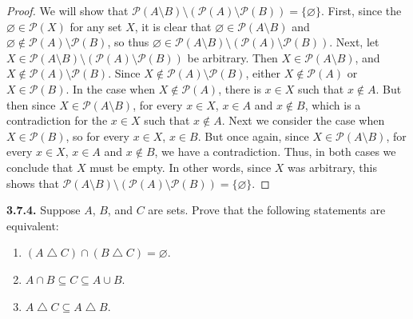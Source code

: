 \documentclass[12pt]{amsart}
\newenvironment{statement}[1]{\smallskip\noindent\color[rgb]{.6627, .3529, .6314} {\bf #1.}}{}
\theoremstyle{definition}
\theoremstyle{remark}
\newcommand{\powerset}[1]{\mathscr{P} \left( #1 \right)}
\begin{document}
\begin{proof}
We will show that $\powerset{A \setminus B} \setminus (\powerset{A} \setminus \powerset{B}) = \{ \varnothing \}$.
First, since the $\varnothing \in \powerset{X}$ for any set $X$, it is clear that $\varnothing \in \powerset{A \setminus B}$ and $\varnothing \notin \powerset{A} \setminus \powerset{B}$,
so thus $\varnothing \in \powerset{A \setminus B} \setminus (\powerset{A} \setminus \powerset{B})$.
Next, let $X \in \powerset{A \setminus B} \setminus (\powerset{A} \setminus \powerset{B})$ be arbitrary.
Then $X \in \powerset{A \setminus B}$, and $X \notin \powerset{A} \setminus \powerset{B}$.
Since $X \notin \powerset{A} \setminus \powerset{B}$, either $X \notin \powerset{A}$ or $X \in \powerset{B}$.
In the case when $X \notin \powerset{A}$, there is $x \in X$ such that $x \notin A$.
But then since $X \in \powerset{A \setminus B}$, for every $x \in X$, $x \in A$ and $x \notin B$, which is a contradiction for the $x \in X$ such that $x \notin A$.
Next we consider the case when $X \in \powerset{B}$, so for every $x \in X$, $x \in B$.
But once again, since $X \in \powerset{A \setminus B}$, for every $x \in X$, $x \in A$ and $x \notin B$, we have a contradiction.
Thus, in both cases we conclude that $X$ must be empty.
In other words, since $X$ was arbitrary, this shows that $\powerset{A \setminus B} \setminus (\powerset{A} \setminus \powerset{B}) = \{ \varnothing \}$.
\end{proof}


\begin{statement}{3.7.4}
Suppose $A$, $B$, and $C$ are sets.
Prove that the following statements are equivalent:
\begin{enumerate}
	\item $(A \bigtriangleup C) \cap (B \bigtriangleup C) = \varnothing$.
	
	\item $A \cap B \subseteq C \subseteq A \cup B$.
	
	\item $A \bigtriangleup C \subseteq A \bigtriangleup B$.
\end{enumerate}
\end{statement}
\end{document}
